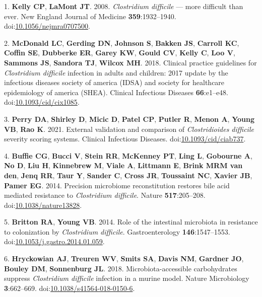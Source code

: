 \documentclass[
  12pt,
]{article}
\newenvironment{cslreferences}%
  {}%
  {\par}
\begin{document}
\hypertarget{refs}{}
\begin{cslreferences}
\leavevmode\hypertarget{ref-Kelly2008}{}%
1. \textbf{Kelly CP}, \textbf{LaMont JT}. 2008. \emph{Clostridium
difficile} --- more difficult than ever. New England Journal of Medicine
\textbf{359}:1932--1940.
doi:\href{https://doi.org/10.1056/nejmra0707500}{10.1056/nejmra0707500}.

\leavevmode\hypertarget{ref-McDonald2018}{}%
2. \textbf{McDonald LC}, \textbf{Gerding DN}, \textbf{Johnson S},
\textbf{Bakken JS}, \textbf{Carroll KC}, \textbf{Coffin SE},
\textbf{Dubberke ER}, \textbf{Garey KW}, \textbf{Gould CV},
\textbf{Kelly C}, \textbf{Loo V}, \textbf{Sammons JS}, \textbf{Sandora
TJ}, \textbf{Wilcox MH}. 2018. Clinical practice guidelines for
\emph{Clostridium difficile} infection in adults and children: 2017
update by the infectious diseases society of america (IDSA) and society
for healthcare epidemiology of america (SHEA). Clinical Infectious
Diseases \textbf{66}:e1--e48.
doi:\href{https://doi.org/10.1093/cid/cix1085}{10.1093/cid/cix1085}.

\leavevmode\hypertarget{ref-Perry2021}{}%
3. \textbf{Perry DA}, \textbf{Shirley D}, \textbf{Micic D},
\textbf{Patel CP}, \textbf{Putler R}, \textbf{Menon A}, \textbf{Young
VB}, \textbf{Rao K}. 2021. External validation and comparison of
\emph{Clostridioides difficile} severity scoring systems. Clinical
Infectious Diseases.
doi:\href{https://doi.org/10.1093/cid/ciab737}{10.1093/cid/ciab737}.

\leavevmode\hypertarget{ref-Buffie2014}{}%
4. \textbf{Buffie CG}, \textbf{Bucci V}, \textbf{Stein RR},
\textbf{McKenney PT}, \textbf{Ling L}, \textbf{Gobourne A}, \textbf{No
D}, \textbf{Liu H}, \textbf{Kinnebrew M}, \textbf{Viale A},
\textbf{Littmann E}, \textbf{Brink MRM van den}, \textbf{Jenq RR},
\textbf{Taur Y}, \textbf{Sander C}, \textbf{Cross JR}, \textbf{Toussaint
NC}, \textbf{Xavier JB}, \textbf{Pamer EG}. 2014. Precision microbiome
reconstitution restores bile acid mediated resistance to
\emph{Clostridium difficile}. Nature \textbf{517}:205--208.
doi:\href{https://doi.org/10.1038/nature13828}{10.1038/nature13828}.

\leavevmode\hypertarget{ref-Britton2014}{}%
5. \textbf{Britton RA}, \textbf{Young VB}. 2014. Role of the intestinal
microbiota in resistance to colonization by \emph{Clostridium
difficile}. Gastroenterology \textbf{146}:1547--1553.
doi:\href{https://doi.org/10.1053/j.gastro.2014.01.059}{10.1053/j.gastro.2014.01.059}.

\leavevmode\hypertarget{ref-Hryckowian2018}{}%
6. \textbf{Hryckowian AJ}, \textbf{Treuren WV}, \textbf{Smits SA},
\textbf{Davis NM}, \textbf{Gardner JO}, \textbf{Bouley DM},
\textbf{Sonnenburg JL}. 2018. Microbiota-accessible carbohydrates
suppress \emph{Clostridium difficile} infection in a murine model.
Nature Microbiology \textbf{3}:662--669.
doi:\href{https://doi.org/10.1038/s41564-018-0150-6}{10.1038/s41564-018-0150-6}.


\end{cslreferences}
\end{document}
